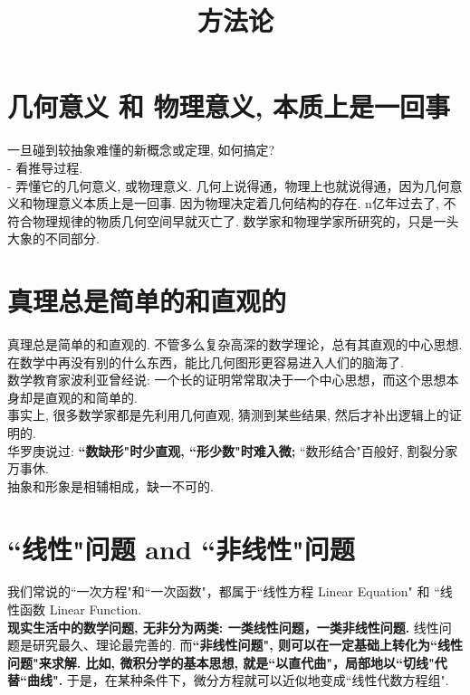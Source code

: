 \documentclass[UTF8]{ctexart}
\title{方法论}
\begin{document}
\tableofcontents %
\date{} %
\maketitle  %

\section{几何意义 和 物理意义, 本质上是一回事}

一旦碰到较抽象难懂的新概念或定理, 如何搞定? \\
- 看推导过程.\\
- 弄懂它的几何意义, 或物理意义. 几何上说得通，物理上也就说得通，因为几何意义和物理意义本质上是一回事. 因为物理决定着几何结构的存在. n亿年过去了, 不符合物理规律的物质几何空间早就灭亡了. 数学家和物理学家所研究的，只是一头大象的不同部分. \\


\section{真理总是简单的和直观的}

真理总是简单的和直观的. 不管多么复杂高深的数学理论，总有其直观的中心思想. 在数学中再没有别的什么东西，能比几何图形更容易进入人们的脑海了.  \\
数学教育家波利亚曾经说: 一个长的证明常常取决于一个中心思想，而这个思想本身却是直观的和简单的.\\

事实上, 很多数学家都是先利用几何直观, 猜测到某些结果, 然后才补出逻辑上的证明的.\\
华罗庚说过: \textbf{``数缺形"时少直观, ``形少数"时难入微;} ``数形结合"百般好, 割裂分家万事休. \\
抽象和形象是相辅相成，缺一不可的.\\


\section{``线性"问题 and ``非线性"问题}

我们常说的``一次方程"和``一次函数"，都属于``线性方程 Linear Equation" 和 ``线性函数 Linear Function. \\
\textbf{现实生活中的数学问题, 无非分为两类: 一类线性问题，一类非线性问题.} 线性问题是研究最久、理论最完善的. 而\textbf{``非线性问题", 则可以在一定基础上转化为``线性问题"来求解.  比如, 微积分学的基本思想, 就是``以直代曲"，局部地以``切线"代替``曲线".} 于是，在某种条件下，微分方程就可以近似地变成``线性代数方程组".\\
\end{document}
